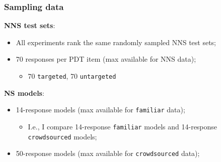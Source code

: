 \documentclass[xcolor={dvipsnames}]{beamer}
\newcommand{\param}[1]{\texttt{#1}}
\begin{document}
\begin{frame}
\frametitle{Sampling data}
\normalsize

\pause
\textbf{NNS test sets}:
\begin{itemize}
\item All experiments rank the same randomly sampled NNS test sets;
\item 70 responses per PDT item (max available for NNS data);
\begin{itemize}
\item 70 \param{targeted}, 70 \param{untargeted}
\end{itemize}
\end{itemize}

\vspace{1.5em}

\pause
\textbf{NS models}:
\begin{itemize}
\item 14-response models (max available for \param{familiar} data);
\begin{itemize}
\item I.e., I compare 14-response \param{familiar} models and 14-response \param{crowd\-sourced} models;
\end{itemize}
\item 50-response models (max available for \param{crowdsourced} data);
\end{itemize}
\end{frame}
\end{document}
